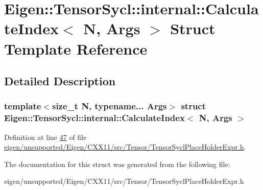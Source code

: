 \hypertarget{struct_eigen_1_1_tensor_sycl_1_1internal_1_1_calculate_index}{}\section{Eigen\+:\+:Tensor\+Sycl\+:\+:internal\+:\+:Calculate\+Index$<$ N, Args $>$ Struct Template Reference}
\label{struct_eigen_1_1_tensor_sycl_1_1internal_1_1_calculate_index}


\subsection{Detailed Description}
\subsubsection*{template$<$size\+\_\+t N, typename... Args$>$\newline
struct Eigen\+::\+Tensor\+Sycl\+::internal\+::\+Calculate\+Index$<$ N, Args $>$}



Definition at line \hyperlink{eigen_2unsupported_2_eigen_2_c_x_x11_2src_2_tensor_2_tensor_sycl_place_holder_expr_8h_source_l00047}{47} of file \hyperlink{eigen_2unsupported_2_eigen_2_c_x_x11_2src_2_tensor_2_tensor_sycl_place_holder_expr_8h_source}{eigen/unsupported/\+Eigen/\+C\+X\+X11/src/\+Tensor/\+Tensor\+Sycl\+Place\+Holder\+Expr.\+h}.



The documentation for this struct was generated from the following file\+:\begin{DoxyCompactItemize}
\item 
eigen/unsupported/\+Eigen/\+C\+X\+X11/src/\+Tensor/\+Tensor\+Sycl\+Place\+Holder\+Expr.\+h\end{DoxyCompactItemize}
